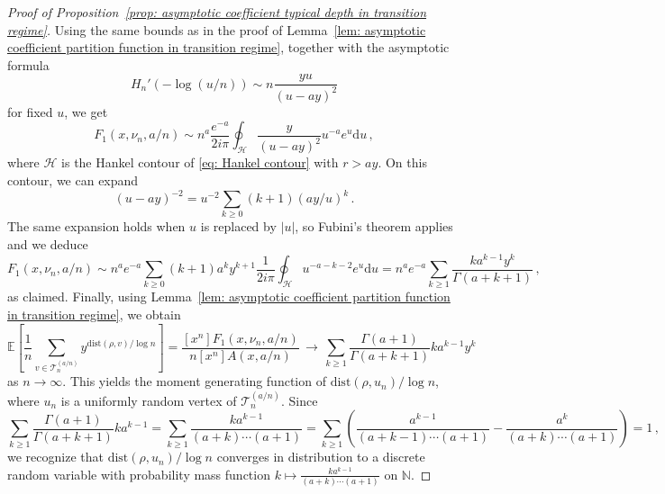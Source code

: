 \documentclass{article}
\theoremstyle{remark}
\newcommand{\bN}{\mathbb{N}}
\newcommand{\cv}[1]{\,\underset{#1}{\longrightarrow}\,}
\newcommand{\dist}{\mathrm{dist}}
\newcommand{\cT}{\mathcal{T}}
\newcommand{\cH}{\mathcal{H}}
\newcommand{\expec}[1]{\mathbb{E}{\left[#1\right]}}
\begin{document}
\begin{proof}[Proof of Proposition~\ref{prop: asymptotic coefficient typical depth in transition regime}]
    Using the same bounds as in the proof of Lemma~\ref{lem: asymptotic coefficient partition function in transition regime}, together with the asymptotic formula
    \begin{equation*}
        H_n'(-\log(u/n)) \sim n \frac{yu}{(u-ay)^2}
    \end{equation*}
    for fixed $u$, we get
    \begin{equation*}
        [x^n]F_1\left(x, \nu_n, a/n\right) \sim n^a \frac{e^{-a}}{2i\pi} \oint_\cH \frac{y}{(u-ay)^2} u^{-a} e^u \mathrm{d}u\,,
    \end{equation*}
    where $\cH$ is the Hankel contour of \eqref{eq: Hankel contour} with $r>ay$.
    On this contour, we can expand
    \begin{equation*}
        (u-ay)^{-2} = u^{-2} \sum_{k\ge0} (k+1) (ay/u)^k \,.
    \end{equation*}
    The same expansion holds when $u$ is replaced by $|u|$, so Fubini's theorem applies and we deduce
    \begin{equation*}
        [x^n]F_1\left(x, \nu_n, a/n\right) \sim n^a e^{-a} \sum_{k\ge0} (k+1) a^k y^{k+1} \frac{1}{2i\pi} \oint_{\cH} u^{-a-k-2} e^u \mathrm{d}u
        = n^a e^{-a} \sum_{k\ge1} \frac{ k a^{k-1} y^{k} }{\Gamma(a+k+1)}\,,
    \end{equation*}
    as claimed.
    Finally, using Lemma~\ref{lem: asymptotic coefficient partition function in transition regime}, we obtain
    \begin{equation*}
        \expec{\frac1n \sum_{v\in \cT_n^{(a/n)}} y^{\dist(\rho,v)/\log n}}
        = \frac{[x^n] F_1\left(x, \nu_n, a/n\right)}{n [x^n] A(x,a/n)}
        \cv{} \sum_{k\ge1} \frac{\Gamma(a+1)}{\Gamma(a+k+1)} k a^{k-1} y^{k} 
    \end{equation*}
    as $n\to\infty$.
    This yields the moment generating function of $\dist(\rho,u_n) / \log n$, where $u_n$ is a uniformly random vertex of $\cT_n^{(a/n)}$.
    Since
    \begin{equation*}
       \sum_{k\ge1} \frac{\Gamma(a+1)}{\Gamma(a+k+1)} k a^{k-1} 
       = \sum_{k\ge1} \frac{ka^{k-1}}{(a+k)\cdots(a+1)}
       = \sum_{k\ge1} \left( \frac{a^{k-1}}{(a+k-1)\cdots(a+1)} - \frac{a^k}{(a+k)\cdots(a+1)} \right) = 1 \,,
    \end{equation*}
    we recognize that $\dist(\rho,u_n) / \log n$ converges in distribution to a discrete random variable with probability mass function $k \mapsto \frac{ka^{k-1}}{(a+k)\cdots(a+1)}$ on $\bN$.
\end{proof}
\end{document}
